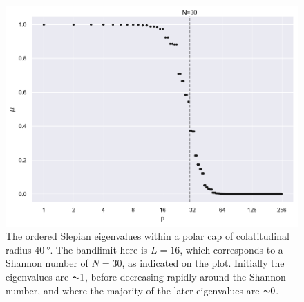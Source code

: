 \begin{figure}[htpb]
	\centering\capstart{}
	\includegraphics[width=\textwidth]{polar_cap_eigenvalues.pdf}
	\caption[
		The Slepian eigenvalues within a \(\SI{40}{\degree}\) polar cap
	]{
		The ordered Slepian eigenvalues within a polar cap of colatitudinal radius \(\SI{40}{\degree}\).
		The bandlimit here is  \(L=16\), which corresponds to a Shannon number of \(N=30\), as indicated on the plot.
		Initially the eigenvalues are \({\thicksim}1\), before decreasing rapidly around the Shannon number, and where the majority of the later eigenvalues are \({\thicksim}0\).
	}\label{fig:chapter2_polar_cap_eigenvalues}
\end{figure}
